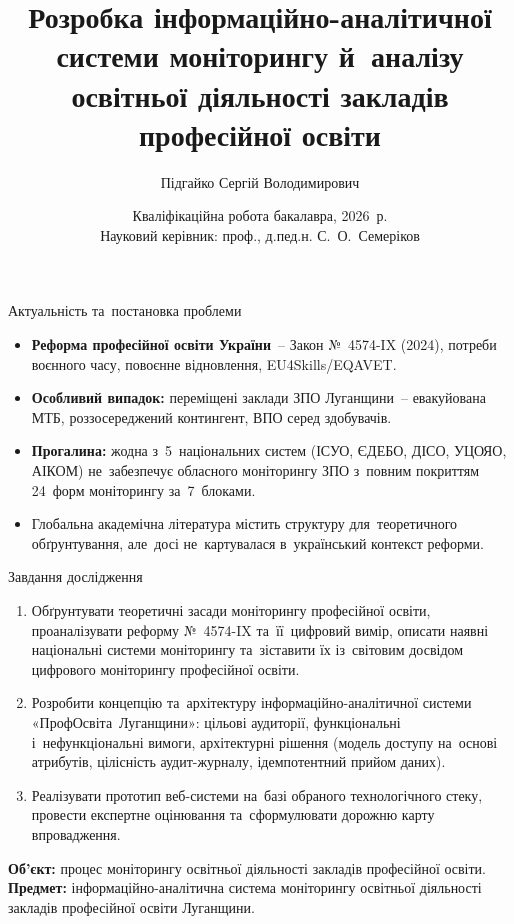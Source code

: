 \documentclass[14pt,aspectratio=169]{beamer}
\title[Моніторинг ЗПО]{Розробка інформаційно-аналітичної системи моніторингу й~аналізу освітньої діяльності закладів професійної освіти}
\author[Підгайко С.В.]{Підгайко Сергій Володимирович}
\institute[КДПУ]{Криворізький державний педагогічний університет\\Фізико-математичний факультет\\Кафедра інформатики та прикладної математики}
\date[2026]{Кваліфікаційна робота бакалавра, 2026~р.\\Науковий керівник: проф., д.пед.н. С.~О.~Семеріков}
\begin{document}
\begin{frame}
\titlepage
\end{frame}

\begin{frame}{Актуальність та~постановка проблеми}
\begin{itemize}
\item \textbf{Реформа професійної освіти України}~-- Закон №~4574-IX (2024), потреби воєнного часу, повоєнне відновлення, EU4Skills/EQAVET.
\item \textbf{Особливий випадок:} переміщені заклади ЗПО Луганщини~-- евакуйована МТБ, роззосереджений контингент, ВПО серед здобувачів.
\item \textbf{Прогалина:} жодна з~5~національних систем (ІСУО, ЄДЕБО, ДІСО, УЦОЯО, АІКОМ) не~забезпечує обласного моніторингу ЗПО з~повним покриттям 24~форм моніторингу за~7~блоками.
\item Глобальна академічна література містить структуру для~теоретичного обґрунтування, але~досі не~картувалася в~український контекст реформи.
\end{itemize}
\end{frame}

\begin{frame}{Завдання дослідження}
\begin{enumerate}\small
\item Обґрунтувати теоретичні засади моніторингу професійної освіти, проаналізувати реформу №~4574-IX та~її~цифровий вимір, описати наявні національні системи моніторингу та~зіставити їх із~світовим досвідом цифрового моніторингу професійної освіти.
\item Розробити концепцію та~архітектуру інформаційно-аналітичної системи «ПрофОсвіта~Луганщини»: цільові аудиторії, функціональні і~нефункціональні вимоги, архітектурні рішення (модель доступу на~основі атрибутів, цілісність аудит-журналу, ідемпотентний прийом даних).
\item Реалізувати прототип веб-системи на~базі обраного технологічного стеку, провести експертне оцінювання та~сформулювати дорожню карту впровадження.
\end{enumerate}
\textbf{Об'єкт:} процес моніторингу освітньої діяльності закладів професійної освіти.\\
\textbf{Предмет:} інформаційно-аналітична система моніторингу освітньої діяльності закладів професійної освіти Луганщини.
\end{frame}
\end{document}
